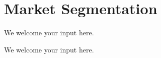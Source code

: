 \section{Market Segmentation}\label{sec:ekgmm-a-2-1}

We welcome your input here.

\ekgmmContextSection

We welcome your input here.


